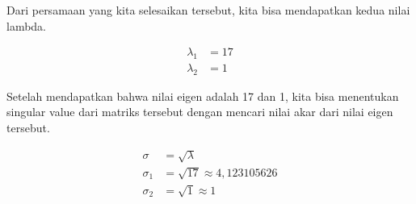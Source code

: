 \documentclass{article}
\begin{document}
Dari persamaan yang kita selesaikan tersebut, kita bisa mendapatkan kedua nilai lambda.

\begin{align*}
    \lambda_1 &= 17\\
    \lambda_2 &= 1
\end{align*}

Setelah mendapatkan bahwa nilai eigen adalah 17 dan 1, kita bisa menentukan singular value dari matriks tersebut dengan mencari nilai akar dari nilai eigen tersebut.

\begin{align*}
    \sigma &= \sqrt{\lambda}\\
    \sigma_1&= \sqrt{17} \approx 4,123105626\\
    \sigma_2&= \sqrt{1} \approx 1
\end{align*}
\end{document}
